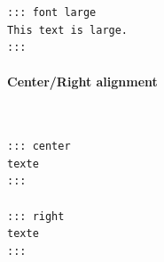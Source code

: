 \documentclass[a4paper,twoside]{article}
\begin{document}
\begin{tscode}[lang=text, engine=pygments]
\begin{Verbatim}[commandchars=\\\{\},breaklines, breakanywhere, commandchars=\\\{\}]
::: font large
This text is large.
:::
\end{Verbatim}
\end{tscode}
\paragraph{Center/Right alignment}\mbox{}\\
\begin{tscode}[lang=md, engine=pygments]
\begin{Verbatim}[commandchars=\\\{\},breaklines, breakanywhere, commandchars=\\\{\}]
::: center
texte
:::

::: right
texte
:::
\end{Verbatim}
\end{tscode}
\end{document}
